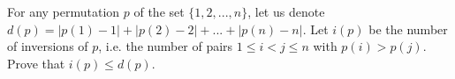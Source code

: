For any permutation $p$ of the set $\{1,2,...,n\}$, let us denote $d(p) = |p(1)-1|+|p(2)-2|+...+|p(n)-n|$.
Let $i(p)$ be the number of inversions of $p$, i.e. the number of pairs $1 \le i < j \le  n$ with $p(i) > p(j)$.
Prove that $i(p) \le  d(p)$.